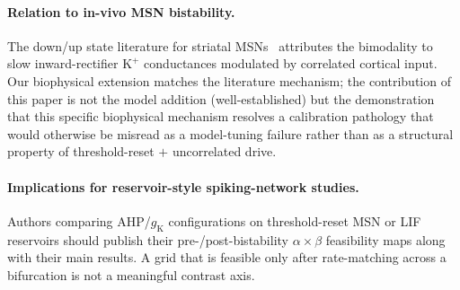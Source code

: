 \documentclass[11pt]{article}
\newcommand{\gK}{g_{\text{K}}}
\begin{document}
\paragraph{Relation to in-vivo MSN bistability.} The down/up state
literature for striatal
MSNs~\cite{wilson1996, mahon2006, nisenbaum1995} attributes the
bimodality to slow inward-rectifier $\text{K}^+$ conductances modulated
by correlated cortical input. Our biophysical extension matches the
literature mechanism; the contribution of this paper is not the
model addition (well-established) but the demonstration that this
specific biophysical mechanism resolves a calibration pathology that
would otherwise be misread as a model-tuning failure rather than as
a structural property of threshold-reset $+$ uncorrelated drive.

\paragraph{Implications for reservoir-style spiking-network studies.}
Authors comparing AHP/$\gK$ configurations on threshold-reset MSN or
LIF reservoirs should publish their pre-/post-bistability
$\alpha\times\beta$ feasibility maps along with their main results.
A grid that is feasible only after rate-matching across a
bifurcation is not a meaningful contrast axis.

\printbibliography
\end{document}
